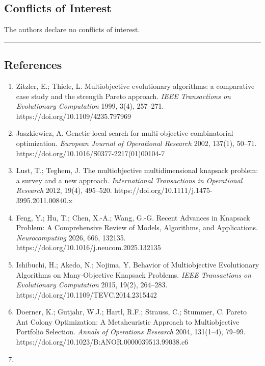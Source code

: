 \documentclass[
]{article}
\begin{document}
\subsection{Conflicts of Interest}\label{conflicts-of-interest}

The authors declare no conflicts of interest.

\begin{center}\rule{0.5\linewidth}{0.5pt}\end{center}

\subsection{References}\label{references}

\begin{enumerate}
\def\labelenumi{\arabic{enumi}.}
\item
  Zitzler, E.; Thiele, L. Multiobjective evolutionary algorithms: a comparative case study and the strength Pareto approach. \emph{IEEE Transactions on Evolutionary Computation} 1999, 3(4), 257--271. https://doi.org/10.1109/4235.797969
\item
  Jaszkiewicz, A. Genetic local search for multi-objective combinatorial optimization. \emph{European Journal of Operational Research} 2002, 137(1), 50--71. https://doi.org/10.1016/S0377-2217(01)00104-7
\item
  Lust, T.; Teghem, J. The multiobjective multidimensional knapsack problem: a survey and a new approach. \emph{International Transactions in Operational Research} 2012, 19(4), 495--520. https://doi.org/10.1111/j.1475-3995.2011.00840.x
\item
  Feng, Y.; Hu, T.; Chen, X.-A.; Wang, G.-G. Recent Advances in Knapsack Problem: A Comprehensive Review of Models, Algorithms, and Applications. \emph{Neurocomputing} 2026, 666, 132135. https://doi.org/10.1016/j.neucom.2025.132135
\item
  Ishibuchi, H.; Akedo, N.; Nojima, Y. Behavior of Multiobjective Evolutionary Algorithms on Many-Objective Knapsack Problems. \emph{IEEE Transactions on Evolutionary Computation} 2015, 19(2), 264--283. https://doi.org/10.1109/TEVC.2014.2315442
\item
  Doerner, K.; Gutjahr, W.J.; Hartl, R.F.; Strauss, C.; Stummer, C. Pareto Ant Colony Optimization: A Metaheuristic Approach to Multiobjective Portfolio Selection. \emph{Annals of Operations Research} 2004, 131(1--4), 79--99. https://doi.org/10.1023/B:ANOR.0000039513.99038.c6
\item

\end{enumerate}
\end{document}
